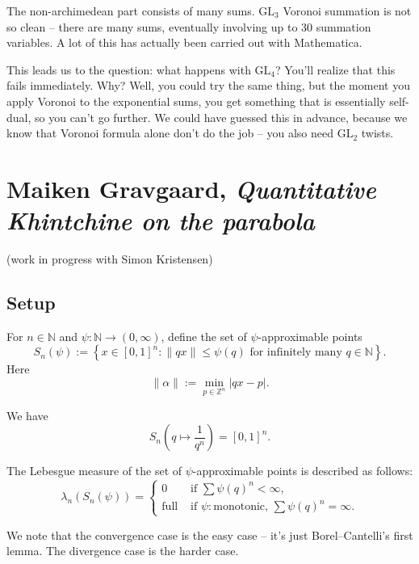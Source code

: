 \documentclass[reqno]{amsart} 
\numberwithin{theorem}{section}
\numberwithin{equation}{section}
\begin{document}
\begin{remark}
  The non-archimedean part consists of many sums.  $\mathrm{GL}_3$ Voronoi summation is not so clean -- there are many sums, eventually involving up to $30$ summation variables.  A lot of this has actually been carried out with Mathematica.
\end{remark}

\begin{remark}
  This leads us to the question: what happens with $\mathrm{GL}_4$?  You'll realize that this fails immediately.  Why?  Well, you could try the same thing, but the moment you apply Voronoi to the exponential sums, you get something that is essentially self-dual, so you can't go further.  We could have guessed this in advance, because we know that Voronoi formula alone don't do the job -- you also need $\mathrm{GL}_2$ twists.
\end{remark}

\section{Maiken Gravgaard, \emph{Quantitative Khintchine on the parabola}}

(work in progress with Simon Kristensen)

\subsection{Setup}

For $n \in \mathbb{N}$ and $\psi : \mathbb{N} \rightarrow(0, \infty)$, define the set of $\psi$-approximable points
\begin{equation*}
  S_n(\psi) := \left\{ x \in[0, 1]^n :
    \lVert q x \rVert \leq \psi(q)
    \text{ for infinitely many } q \in \mathbb{N}\right\}.
\end{equation*}
Here
\begin{equation*}
  \lVert \alpha \rVert := \min_{p \in \mathbb{Z}^n} \lvert q x - p \rvert.
\end{equation*}
\begin{example}
  We have
  \begin{equation*}
    S_n \left( q \mapsto \frac{1}{q^n} \right) =[0, 1]^n.
  \end{equation*}
\end{example}
\begin{theorem}[Khintchine, 1924, 1926]
  The Lebesgue measure of the set of $\psi$-approximable points is described as follows:
  \begin{equation*}
    \lambda_n(S_n(\psi)) =
    \begin{cases}
      0 &  \text{ if } \sum \psi(q)^n < \infty, \\
      \text{full}        & \text{ if } \psi:\text{monotonic, } \sum \psi(q)^n = \infty.
    \end{cases}
  \end{equation*}
\end{theorem}
We note that the convergence case is the easy case -- it's just Borel--Cantelli's first lemma.  The divergence case is the harder case.
\end{document}
